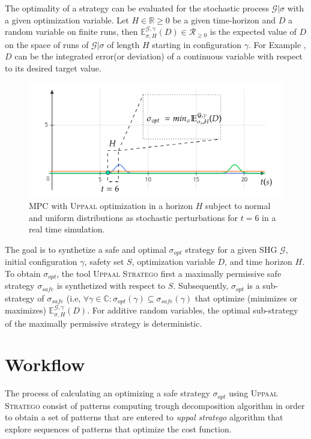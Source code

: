     The optimality of a strategy can be evaluated for the stochastic 
    process $\mathcal{G}|\sigma$ with a given optimization variable.
    Let $H \in \mathbb{R} \geqslant 0$ be a given time-horizon and $D$
    a random variable on finite runs, then $\mathbb{E}^{\mathcal{G},
    \gamma}_{\sigma,H}(D) \in \mathcal{R}_{\geqslant 0}$ is the 
    expected value of $D$ on the space of runs of $\mathcal{G|\sigma}$
    of length $H$ starting in configuration $\gamma$. For Example
    , $D$ can be the integrated error(or deviation) of a continuous 
    variable with respect to its desired target value.

    \clearpage

    \begin{figure}[!hbt]
      \centering
      \includegraphics[width=0.7\linewidth]{images/realtime}      
      \caption{\ac{MPC} with \textsc{Uppaal} optimization in a 
      horizon $H$ subject to normal and uniform distributions as stochastic perturbations for $t=6$ in a real time simulation.}
      \label{fig:realtime}
    \end{figure}
    
    The goal is to synthetize a safe and optimal $\sigma_{opt}$ 
    strategy for a given \ac{SHG} $\mathcal{G}$, initial configuration
    $\gamma$, safety set $S$, optimization variable $D$, and time 
    horizon $H$. To obtain 
    $\sigma_{opt}$, the tool \textsc{Uppaal Stratego} first a 
    maximally permissive safe strategy $\sigma_{safe}$ is synthetized
    with respect to $S$. Subsequently, $\sigma_{opt}$ is a sub-strategy
    of $\sigma_{safe}$ (i.e, $\forall \gamma \in \mathbb{C}: 
    \sigma_{opt}(\gamma) \subseteq \sigma_{safe}(\gamma)$ that 
    optimize (minimizes or maximizes) $\mathbb{E}^{\mathcal{G},
    \gamma}_{\sigma,H}(D)$. For additive random variables, the 
    optimal sub-strategy of the maximally permissive strategy is 
    deterministic.
    
  \section{Workflow}
  \label{sec:workflow}
  The process of calculating an optimizing a safe strategy $\sigma_{opt}$
  using \textsc{Uppaal Stratego} consist of patterns computing trough 
  decomposition algorithm in order to obtain a set of patterns that 
  are entered to  \emph{uppal stratego} algorithm that explore 
  sequences of patterns that optimize the cost function.

